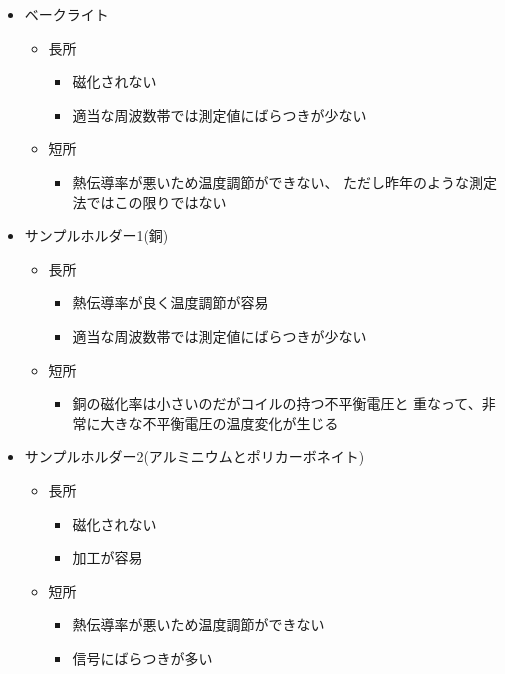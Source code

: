 \begin{itemize}
	\item ベークライト
	\begin{itemize}
		\item 長所
		\begin{itemize}
			\item 磁化されない
			\item 適当な周波数帯では測定値にばらつきが少ない
		\end{itemize}
		\item 短所
		\begin{itemize}
			\item 熱伝導率が悪いため温度調節ができない、
			ただし昨年のような測定法ではこの限りではない
		\end{itemize}
	\end{itemize}
		\item サンプルホルダー1(銅)
	\begin{itemize}
		\item 長所
		\begin{itemize}
			\item 熱伝導率が良く温度調節が容易
			\item 適当な周波数帯では測定値にばらつきが少ない
		\end{itemize}
		\item 短所
		\begin{itemize}
			\item 銅の磁化率は小さいのだがコイルの持つ不平衡電圧と
			重なって、非常に大きな不平衡電圧の温度変化が生じる
		\end{itemize}
	\end{itemize}
		\item サンプルホルダー2(アルミニウムとポリカーボネイト)
	\begin{itemize}
		\item 長所
		\begin{itemize}
			\item 磁化されない
			\item 加工が容易
		\end{itemize}
		\item 短所
		\begin{itemize}
			\item 熱伝導率が悪いため温度調節ができない
			\item 信号にばらつきが多い
		\end{itemize}
	\end{itemize}
\end{itemize}


